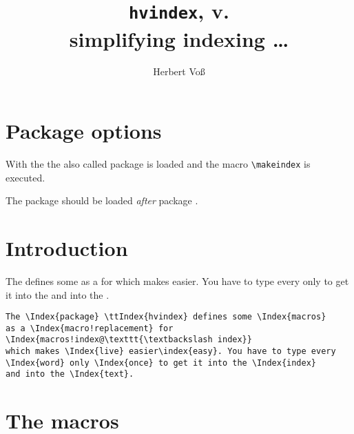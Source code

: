 \documentclass[ngerman]{article}
\title{\texttt{hvindex}, v. \fileversion\\ simplifying indexing \ldots}
\author{Herbert Voß}
\date{\filedate}
\begin{document}
\maketitle

\tableofcontents

\section{Package options}
With the   the also called package is 
loaded and the macro \texttt{\textbackslash{}makeindex}
is executed.

The package should be loaded \emph{after} package .

\section{Introduction}
The   defines some 
as a  for 
which makes  easier. You have to type every
 only  to get it into the  
and into the .


\small
\begin{verbatim}
The \Index{package} \ttIndex{hvindex} defines some \Index{macros}
as a \Index{macro!replacement} for 
\Index{macros!index@\texttt{\textbackslash index}} 
which makes \Index{live} easier\index{easy}. You have to type every
\Index{word} only \Index{once} to get it into the \Index{index} 
and into the \Index{text}.
\end{verbatim}
\normalsize


\clearpage
\section{The macros}
\end{document}
